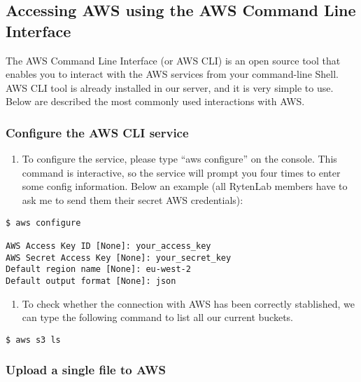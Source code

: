 \documentclass[]{book}
\providecommand{\tightlist}{%
  \setlength{\itemsep}{0pt}\setlength{\parskip}{0pt}}
\begin{document}
\subsection{Accessing AWS using the AWS Command Line
Interface}\label{accessing-aws-using-the-aws-command-line-interface}

The AWS Command Line Interface (or AWS CLI) is an open source tool that
enables you to interact with the AWS services from your command-line
Shell. AWS CLI tool is already installed in our server, and it is very
simple to use. Below are described the most commonly used interactions
with AWS.

\subsubsection{Configure the AWS CLI
service}\label{configure-the-aws-cli-service}

\begin{enumerate}
\def\labelenumi{\arabic{enumi}.}
\tightlist
\item
  To configure the service, please type ``aws configure'' on the
  console. This command is interactive, so the service will prompt you
  four times to enter some config information. Below an example (all
  RytenLab members have to ask me to send them their secret AWS
  credentials):
\end{enumerate}

\begin{verbatim}
$ aws configure 

AWS Access Key ID [None]: your_access_key 
AWS Secret Access Key [None]: your_secret_key 
Default region name [None]: eu-west-2 
Default output format [None]: json 
\end{verbatim}

\begin{enumerate}
\def\labelenumi{\arabic{enumi}.}
\setcounter{enumi}{1}
\tightlist
\item
  To check whether the connection with AWS has been correctly
  stablished, we can type the following command to list all our current
  buckets.
\end{enumerate}

\begin{verbatim}
$ aws s3 ls 
\end{verbatim}

\subsubsection{Upload a single file to
AWS}\label{upload-a-single-file-to-aws}
\end{document}
